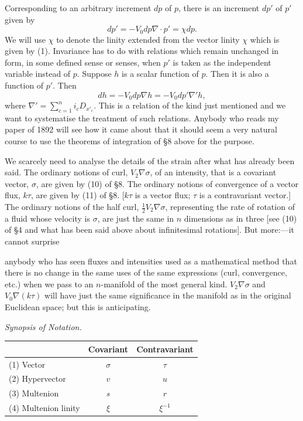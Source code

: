 \documentclass[11pt]{article}
\begin{document}
\indent Corresponding to an arbitrary increment $dp$ of $p$, there is an increment $dp'$ of $p'$ given by
\begin{equation}dp'=-V_0dp\nabla\cdot p'=\chi dp.\tag{1}\end{equation}
We will use $\chi$ to denote the linity extended from the vector linity $\chi$ which is given by (1). Invariance has to do with relations which remain unchanged in form, in some defined sense or senses, when $p'$ is taken as the independent variable instead of $p$. Suppose $h$ is a scalar function of $p$. Then it is also a function of $p'$. Then
\begin{equation}dh=-V_0dp\nabla h=-V_0dp'\nabla'h,\tag{2}\end{equation}
where $\nabla'=\sum_{c=1}^ni_cD_{x'_c}$. This is a relation of the kind just mentioned and we want to systematise the treatment of such relations. Anybody who reads my paper of 1892 will see how it came about that it should seem a very natural course to use the theorems of integration of §8 above for the purpose.

\indent We scarcely need to analyse the details of the strain after what has already been said. The ordinary notions of curl, $V_2\nabla\sigma$, of an intensity, that is a covariant vector, $\sigma$, are given by (10) of §8. The ordinary notions of convergence of a vector flux, $k\tau$, are given by (11) of §8. [$k\tau$ is a vector flux; $\tau$ is a contravariant vector.] The ordinary notions of the half curl, $\tfrac12V_2\nabla\sigma$, representing the rate of rotation of a fluid whose velocity is $\sigma$, are just the same in $n$ dimensions as in three [see (10) of §4 and what has been said above about infinitesimal rotations]. But more:---it cannot surprise

anybody who has seen fluxes and intensities used as a mathematical method that there is no change in the same uses of the same expressions (curl, convergence, etc.) when we pass to an $n$-manifold of the most general kind. $V_2\nabla\sigma$ and $V_0\nabla(k\tau)$ will have just the same significance in the manifold as in the original Euclidean space; but this is anticipating.

\begin{center}\emph{Synopsis of Notation.}\end{center}
\begin{center}\begin{tabular}{|l|c|c|}\hline
& Covariant & Contravariant\\\hline
(1) Vector & $\sigma$ & $\tau$\\\hline
(2) Hypervector & $v$ & $u$\\\hline
(3) Multenion & $s$ & $r$\\\hline
(4) Multenion linity & $\xi$ & $\xi^{-1}$\\\hline
\end{tabular}\end{center}
\end{document}

